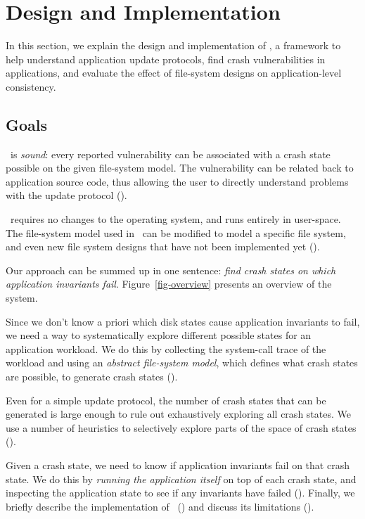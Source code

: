 \section{Design and Implementation}

In this section, we explain the design and implementation of \toolname, a
framework to help understand application update protocols, find crash
vulnerabilities in applications, and evaluate the effect of file-system designs
on application-level consistency. 

\subsection{Goals}
\toolname\ is \textit{sound}: every reported vulnerability can be associated with a
crash state possible on the given file-system model. The vulnerability can be
related back to application source code, thus allowing the user to directly
understand problems with the update protocol (). 

\toolname\ requires no changes to the operating system, and runs entirely in
user-space. The file-system model used in \toolname\ can be modified to model
a specific file system, and even new file system designs that have not been
implemented yet (). 

Our approach can be summed up in one sentence: \textit{find crash states on
which application invariants fail}. Figure~\ref{fig-overview} presents an
overview of the system.

Since we don't know a priori which disk states cause application invariants to
fail, we need a way to systematically explore different possible states
for an application workload. We do this by collecting the system-call trace of
the workload and using an \textit{abstract file-system model}, which defines
what crash states are possible, to generate crash states ().

Even for a simple update protocol, the number of crash states that can be
generated is large enough to rule out exhaustively exploring all crash states.
We use a number of heuristics to selectively explore parts of the space of
crash states (). 

Given a crash state, we need to know if application invariants fail on that
crash state. We do this by \textit{running the application itself} on top of
each crash state, and inspecting the application state to see if any invariants
have failed (). Finally, we briefly describe the
implementation of \toolname\ () and discuss its
limitations ().  
\fi

